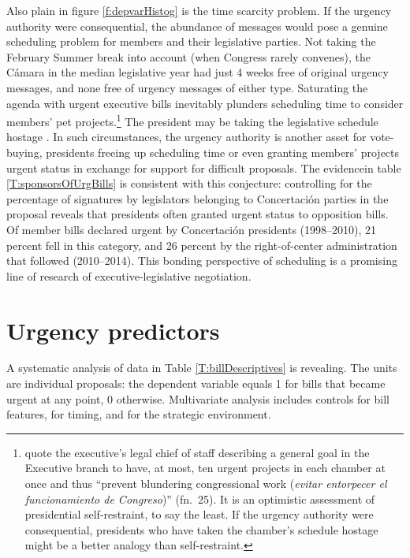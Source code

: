 \documentclass[letter,12pt]{article}
\begin{document}
Also plain in figure \ref{f:depvarHistog} is the time scarcity problem. If the urgency authority were consequential, the abundance of messages would pose a genuine scheduling problem for members and their legislative parties. Not taking the February Summer break into account (when Congress rarely convenes), the C\'amara in the median legislative year had just 4 weeks free of original urgency messages, and none free of urgency messages of either type. Saturating the agenda with urgent executive bills inevitably plunders scheduling time to consider members' pet projects.\footnote{\citet{berrios.gamboa.fiscChile.2006} quote the executive's legal chief of staff describing a general goal in the Executive branch to have, at most, ten urgent projects in each chamber at once and thus ``prevent blundering congressional work (\emph{evitar entorpecer el funcionamiento de Congreso})'' (fn.~25). It is an optimistic assessment of presidential self-restraint, to say the least. If the urgency authority were consequential, presidents who have taken the chamber's schedule hostage might be a better analogy than self-restraint.} The president may be taking the legislative schedule hostage \citep[cf.][]{cox.mccubbins.1994,williamson.1975}. In such circumstances, the urgency authority is another asset for vote-buying, presidents freeing up scheduling time or even granting members' projects urgent status in exchange for support for difficult proposals. The evidencein table \ref{T:sponsorsOfUrgBills} is consistent with this conjecture: controlling for the percentage of signatures by legislators belonging to Concertaci\'on parties in the proposal reveals that presidents often granted urgent status to opposition bills. Of member bills declared urgent by Concertaci\'on presidents (1998--2010), 21 percent fell in this category, and 26 percent by the right-of-center administration that followed (2010--2014). This bonding perspective of scheduling is a promising line of research of executive-legislative negotiation. 


\section{Urgency predictors}

A systematic analysis of data in Table \ref{T:billDescriptives} is revealing. The units are individual proposals: the dependent variable equals 1 for bills that became urgent at any point, 0 otherwise. Multivariate analysis includes controls for bill features, for timing, and for the strategic environment. 
\end{document}
